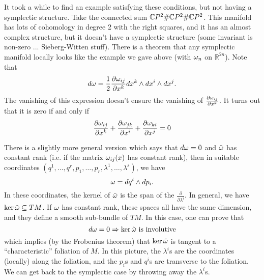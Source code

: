  It took a while to find an example satisfying these conditions,
 but not having a symplectic structure.  Take the connected sum
 $\mathbb{C} P^2 \#\mathbb{C} P^2\#\mathbb{C} P^2$.  This manifold has lots of cohomology
 in degree 2 with the right squares, and it has an almost complex
 structure, but it doesn't have a symplectic structure (some
 invariant is non-zero ... Sieberg-Witten stuff).  There is a
 theorem that any symplectic manifold locally looks like the
 example we gave above (with $\omega_n$ on $\mathbb{R}^{2n}$).  Note
 that
 \[
    d\omega = \frac{1}{2}\frac{\partial \omega_{ij}}{\partial x^k}
    dx^k\wedge dx^i\wedge dx^j.
 \]
 The vanishing of this expression doesn't ensure the vanishing of
 $\frac{\partial \omega_{ij}}{\partial x^k}$.  It turns out that it is zero if and
 only if
 \[
 \frac{\partial \omega_{ij}}{\partial x^k} +
 \frac{\partial \omega_{jk}}{\partial x^i} +
 \frac{\partial \omega_{ki}}{\partial x^j} = 0
 \]

 There is a slightly more general version which says that $d\omega =0$
 and $\tilde {\omega}$ has constant rank (i.e. if the matrix
 $\omega_{ij}(x)$ has constant rank), then in suitable coordinates
 $(q^1,\dots, q^r,p_1,\dots, p_r,\lambda^1,\dots, \lambda^s)$, we
 have
 \[
    \omega = dq^i\wedge dp_i.
 \]
 In these coordinates, the kernel of $\tilde {\omega}$ is the span of
 the $\frac{\partial} {\partial \lambda^i}$.  In general, we have
 $\ker \tilde {\omega} \subseteq TM$.  If $\omega$ has constant rank, these
 spaces all have the same dimension, and they define a smooth
 sub-bundle of $TM$.  In this case, one can prove that
 \[
    d\omega=0 \Rightarrow \ker \tilde {\omega} \text{ is involutive}
 \]
 which implies (by the Frobenius theorem) that $\ker\tilde {\omega}$ is
 tangent to a ``characteristic'' foliation of $M$.  In this
 picture, the $\lambda^i$s are the coordinates (locally) along the
 foliation, and the $p_i$s and $q^i$s are transverse to the
 foliation.  We can get back to the symplectic case by throwing
 away the $\lambda^i$s.
